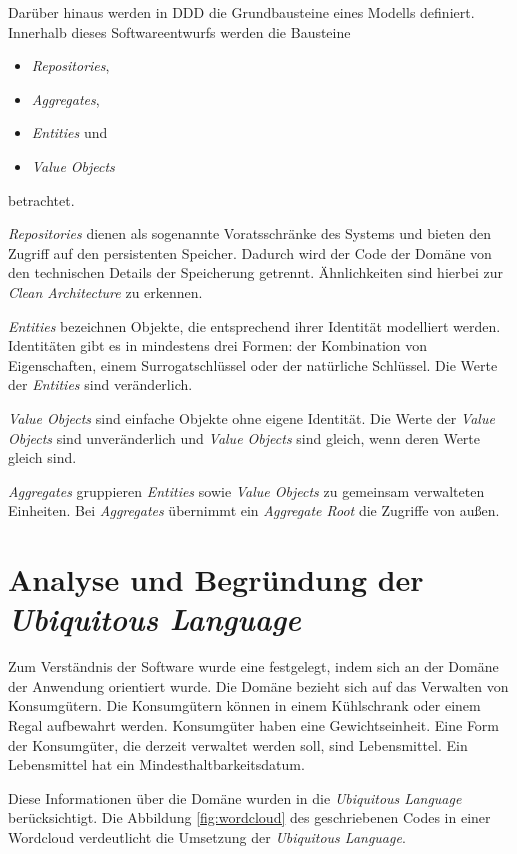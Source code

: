 Darüber hinaus werden in \ac{DDD} die Grundbausteine eines Modells definiert.
Innerhalb dieses Softwareentwurfs werden die Bausteine 
\begin{itemize}
    \item \textit{Repositories}, 
    \item \textit{Aggregates},
    \item \textit{Entities} und
    \item \textit{Value Objects}
\end{itemize}
betrachtet.

\textit{Repositories} dienen als sogenannte \glqq Voratsschränke\grqq{} des Systems und bieten den Zugriff auf den persistenten Speicher.
Dadurch wird der Code der Domäne von den technischen Details der Speicherung getrennt.
Ähnlichkeiten sind hierbei zur \textit{Clean Architecture} zu erkennen.

\textit{Entities} bezeichnen Objekte, die entsprechend ihrer Identität modelliert werden.
Identitäten gibt es in mindestens drei Formen: der Kombination von Eigenschaften, einem Surrogatschlüssel oder der natürliche Schlüssel.
Die Werte der \textit{Entities} sind veränderlich.

\textit{Value Objects} sind einfache Objekte ohne eigene Identität.
Die Werte der \textit{Value Objects} sind unveränderlich und \textit{Value Objects} sind gleich, wenn deren Werte gleich sind.

\textit{Aggregates} gruppieren \textit{Entities} sowie \textit{Value Objects} zu gemeinsam verwalteten Einheiten.
Bei \textit{Aggregates} übernimmt ein \textit{Aggregate Root} die Zugriffe von außen.


\section{Analyse und Begründung der \textit{Ubiquitous Language}}
Zum Verständnis der Software wurde eine  festgelegt, indem sich an der Domäne der Anwendung orientiert wurde.
Die Domäne bezieht sich auf das Verwalten von Konsumgütern.
Die Konsumgütern können in einem Kühlschrank oder einem Regal aufbewahrt werden.
Konsumgüter haben eine Gewichtseinheit.
Eine Form der Konsumgüter, die derzeit verwaltet werden soll, sind Lebensmittel.
Ein Lebensmittel hat ein Mindesthaltbarkeitsdatum.


Diese Informationen über die Domäne wurden in die \textit{Ubiquitous Language} berücksichtigt.
Die Abbildung \ref{fig:wordcloud} des geschriebenen Codes in einer Wordcloud verdeutlicht die Umsetzung der \textit{Ubiquitous Language}.

